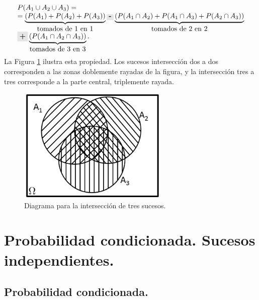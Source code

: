     \[\begin{array}{l}
    P(A_1\cup A_2\cup A_3)=\\
    =\underbrace{\left(P(A_1)+P(A_2)+P(A_3)\right)}_{\mbox{tomados de 1 en 1}}\colorbox{lightgrey}{\bf -}\underbrace{\left(P(A_1\cap A_2)+P(A_1\cap A_3)+P(A_2\cap A_3)\right)}_{\mbox{tomados de 2 en 2}}\\
    \colorbox{lightgrey}{\bf +}\underbrace{\left(P(A_1\cap A_2\cap A_3)\right)}_{\mbox{tomados de 3 en 3}}.
    \end{array}
    \]
La Figura \ref{Cap03:fig:DiagramaVennUnioTresSucesos} ilustra esta propiedad. Los sucesos intersección dos a dos corresponden a las zonas doblemente rayadas de la figura, y la intersección tres a tres corresponde a la parte central, triplemente rayada.

\begin{figure}[h!]
\begin{center}
    \includegraphics[height=5.5cm]{../fig/Cap03-DiagramaVennUnioTresSucesos.png}
	\caption{Diagrama para la intersección de tres sucesos.}
    \label{Cap03:fig:DiagramaVennUnioTresSucesos}
\end{center}
\end{figure}




\section{Probabilidad condicionada. Sucesos independientes.}
\label{cap03:sec:ProbabilidadCondicionadaIndependencia}


\subsection{Probabilidad condicionada.}
\label{cap03:subsec:ProbabilidadCondicionada}

